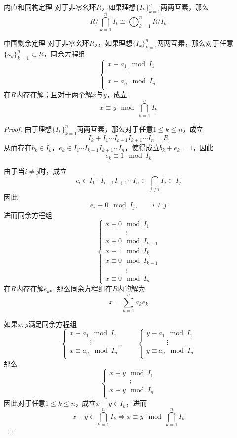 \documentclass[lang = cn, scheme = chinese, thmcnt = section]{elegantbook}
\begin{document}
\begin{theorem}{内直和同构定理}
	对于非零幺环$R$，如果理想$\{ I_k \}_{k=1}^{n}$两两互素，那么
	$$
	R\bigg/\bigcap_{k=1}^{n}I_k\cong \bigoplus_{k=1}^{n}R/I_k
	$$
\end{theorem}

\begin{theorem}{中国剩余定理}
	对于非零幺环$R$，，如果理想$\{ I_k \}_{k=1}^{n}$两两互素，那么对于任意$\{ a_k \}_{k=1}^{n}\subset R$，同余方程组
	$$
	\begin{cases}
		x\equiv a_1\mod I_1\\
		\quad \quad \quad\vdots\\
		x\equiv a_n\mod I_n\\
	\end{cases}
	$$
	在$R$内存在解；且对于两个解$x$与$y$，成立
	$$
	x\equiv y \mod\bigcap_{k=1}^nI_k
	$$
\end{theorem}

\begin{proof}
	由于理想$\{ I_k \}_{k=1}^{n}$两两互素，那么对于任意$1\le k\le n$，成立
	$$
	I_k+I_1\cdots I_{k-1}I_{k+1}\cdots I_n=R
	$$
	从而存在$b_k\in I_k$，$e_k\in I_1\cdots I_{k-1}I_{k+1}\cdots I_n$，使得成立$b_k+e_k=1$，因此
	$$
	e_k\equiv 1\mod I_k
	$$
	
	由于当$i\ne j$时，成立
	$$
	e_i\in I_1\cdots I_{i-1}I_{i+1}\cdots I_n\subset\bigcap_{j\ne i}I_j\subset I_j
	$$
	因此
	$$
	e_i\equiv 0\mod I_j,\qquad i\ne j
	$$
	进而同余方程组
	$$
	\begin{cases}
		x\equiv 0\mod I_1\\
		\quad \quad \quad\vdots\\
		x\equiv 0\mod I_{k-1}\\
		x\equiv 1\mod I_k\\
		x\equiv 0\mod I_{k+1}\\
		\quad \quad \quad\vdots\\
		x\equiv 0\mod I_n
	\end{cases}
	$$
	在$R$内存在解$e_k$。那么同余方程组在$R$内的解为
	$$
	x=\sum_{k=1}^{n}a_ke_k
	$$
	
	如果$x,y$​满足同余方程组
	$$
	\begin{cases}
		x\equiv a_1\mod I_1\\
		\quad \quad \quad\vdots\\
		x\equiv a_n\mod I_n\\
	\end{cases},\qquad 
	\begin{cases}
		y\equiv a_1\mod I_1\\
		\quad \quad \quad\vdots\\
		y\equiv a_n\mod I_n\\
	\end{cases}
	$$
	那么
	$$
	\begin{cases}
		x\equiv y\mod I_1\\
		\quad \quad \quad\vdots\\
		x\equiv y\mod I_n\\
	\end{cases}
	$$
	因此对于任意$1\le k\le n$，成立$x-y\in I_k$，进而
	$$
	x-y\in\bigcap_{k=1}^{n}I_k\iff
	x\equiv y \mod\bigcap_{k=1}^nI_k
	$$
\end{proof}
\end{document}
